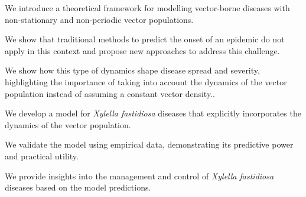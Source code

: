\begin{contributionslist}
    \item We introduce a theoretical framework for modelling vector-borne
    diseases with non-stationary and non-periodic vector populations.

    \item We show that traditional methods to predict the onset of an epidemic
    do not apply in this context and propose new approaches to address this
    challenge.

    \item We show how this type of dynamics shape disease spread and severity,
    highlighting the importance of taking into account the dynamics of
    the vector population instead of assuming a constant vector density..

    \item We develop a model for \textit{Xylella fastidiosa} diseases that
    explicitly incorporates the dynamics of the vector population.

    \item We validate the model using empirical data, demonstrating its
    predictive power and practical utility.

    \item We provide insights into the management and control of
    \textit{Xylella fastidiosa} diseases based on the model predictions.
\end{contributionslist}